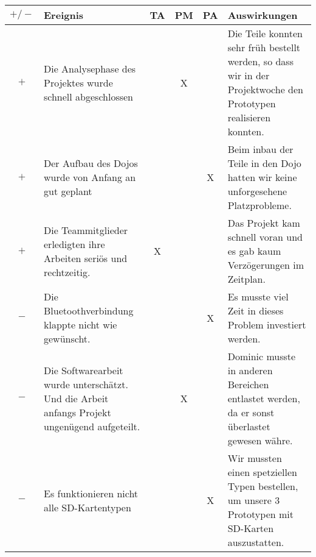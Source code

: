 \begin{center}
    \begin{tabular}{ | c | m{5.5cm} | c | c | c | m{5.5cm} |}
    \hline
    $+/-$ & Ereignis & TA & PM & PA & Auswirkungen \\ \hline
    
$+$ & Die Analysephase des Projektes wurde schnell abgeschlossen & & X & & Die Teile konnten sehr früh bestellt werden, so dass wir in der Projektwoche den Prototypen realisieren konnten. \\ \hline
    
$+$ & Der Aufbau des Dojos wurde von Anfang an gut geplant & & & X & Beim inbau der Teile in den Dojo hatten wir keine unforgesehene Platzprobleme. \\ \hline
    
$+$ & Die Teammitglieder erledigten ihre Arbeiten seriös und rechtzeitig. & X &  & & Das Projekt kam schnell voran und es gab kaum Verzögerungen im Zeitplan. \\ \hline
    
$-$ & Die Bluetoothverbindung klappte nicht wie gewünscht. & &  & X & Es musste viel Zeit in dieses Problem investiert werden.  \\ \hline
    
$-$ & Die Softwarearbeit wurde unterschätzt. Und die Arbeit anfangs Projekt ungenügend aufgeteilt. & & X & & Dominic musste in anderen Bereichen entlastet werden, da er sonst überlastet gewesen währe.  \\ \hline
    
$-$ & Es funktionieren nicht alle SD-Kartentypen & & & X & Wir mussten einen spetziellen Typen bestellen, um unsere 3 Prototypen mit SD-Karten auszustatten.  \\ \hline

    \end{tabular}
\end{center}